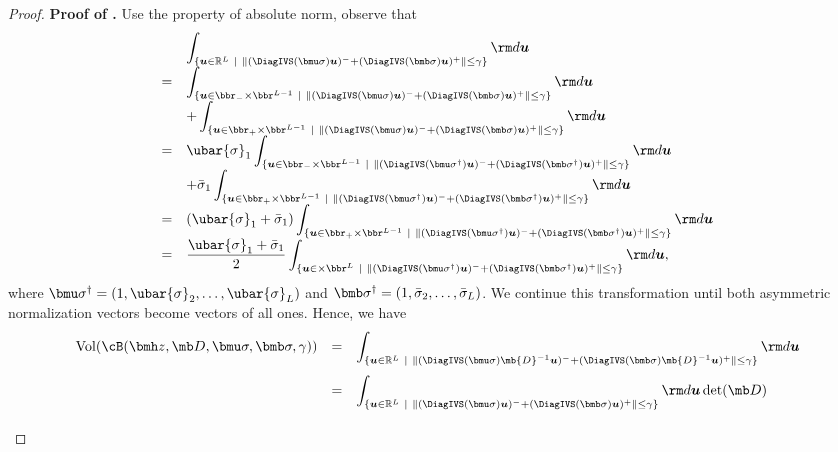 \documentclass[mnsc, nonblindrev]{informswp}
\newcommand{\1}[1]{\mathds{1}{\left(#1\right)}}
\begin{document}
\begin{appendices}
\begin{proof}{\bf Proof of .}
Use the property of absolute norm, observe that 
\[
\begin{array}{cl}
& \displaystyle \int_{\{ \bm u \in \mathbb{R}^L ~|~ \| (\DiagIVS(\bmu \sigma) \bm u)^- + (\DiagIVS(\bmb \sigma) \bm u)^+\| \leq \gamma \}} {\rm d} \bm u \\
= & \displaystyle  \int_{\{\bm u \in \bbr_-\times \bbr^{L-1} ~|~ \|(\DiagIVS(\bmu \sigma) \bm u)^- + (\DiagIVS(\bmb \sigma) \bm u)^+\| \leq \gamma \}} {\rm d} \bm u \\
& \displaystyle + \int_{\{\bm u \in \bbr_+\times \bbr^{L-1} ~|~ \|(\DiagIVS(\bmu \sigma)\bm u)^- + (\DiagIVS(\bmb \sigma) \bm u)^+\| \leq \gamma\}} {\rm d} \bm u \\
= & \displaystyle \ubar{\sigma}_{1} \int_{\{\bm u \in \bbr_-\times \bbr^{L-1} ~|~ \|(\DiagIVS(\bmu \sigma^\dag)  \bm u)^- + (\DiagIVS(\bmb \sigma^\dag) \bm u)^+\| \leq \gamma\}}  {\rm d} \bm u \\
& \displaystyle  \displaystyle  + \bar{\sigma}_{1} \int_{\{\bm u \in \bbr_+\times \bbr^{L-1} ~|~ \|(\DiagIVS(\bmu \sigma^\dag) \bm u)^- + (\DiagIVS(\bmb \sigma^\dag) \bm u)^+\| \leq \gamma\}}  {\rm d} \bm u \\
= & \displaystyle (\ubar{\sigma}_{1} + \bar{\sigma}_{1}) \int_{\{\bm u \in \bbr_+\times \bbr^{L-1} ~|~ \| (\DiagIVS(\bmu \sigma^\dag)\bm u)^- +  (\DiagIVS(\bmb \sigma^\dag) \bm u)^+\| \leq \gamma\}}  {\rm d} \bm u \\
= & \displaystyle \frac{\ubar{\sigma}_{1} + \bar{\sigma}_{1}}{2} \int_{\{\bm u \in \times \bbr^{L} ~|~ \|(\DiagIVS(\bmu \sigma^\dag) \bm u)^- + (\DiagIVS(\bmb \sigma^\dag) \bm u)^+\| \leq \gamma\}}  {\rm d} \bm u,
\end{array}
\]
where $\bmu \sigma^\dag = (1, \ubar{\sigma}_{2}, \dots, \ubar{\sigma}_{L})$ and $\bmb \sigma^\dag = (1, \bar{\sigma}_{2},\dots, \bar{\sigma}_{L})$.
We continue this transformation until both asymmetric normalization vectors become vectors of all ones. Hence, we have
$$
\begin{array}{rcl}
\mathrm{Vol}(\cB(\bmh z, \mb D, \bmu \sigma, \bmb \sigma , \gamma)) & = & \displaystyle \int_{\{ \bm u \in \mathbb{R}^L ~|~ \|(\DiagIVS(\bmu \sigma) \mb{D}^{-1} \bm u)^- + (\DiagIVS(\bmb \sigma) \mb{D}^{-1} \bm u)^+\| \leq \gamma \} } {\rm d} \bm u \\[5mm]
& = & \displaystyle \int_{\{ \bm u \in \mathbb{R}^L ~|~ \|(\DiagIVS(\bmu \sigma) \bm u)^- + (\DiagIVS(\bmb \sigma) \bm u)^+\| \leq \gamma \}} {\rm d} \bm u  \det(\mb D) \\[5mm]

\end{array}$$
\end{proof}
\end{appendices}
\end{document}

